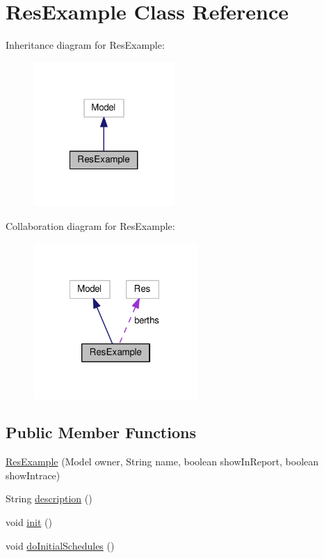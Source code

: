 \hypertarget{class_res_example}{\section{Res\-Example Class Reference}
\label{class_res_example}
}


Inheritance diagram for Res\-Example\-:
\nopagebreak
\begin{figure}[H]
\begin{center}
\leavevmode
\includegraphics[width=152pt]{class_res_example__inherit__graph}
\end{center}
\end{figure}


Collaboration diagram for Res\-Example\-:
\nopagebreak
\begin{figure}[H]
\begin{center}
\leavevmode
\includegraphics[width=177pt]{class_res_example__coll__graph}
\end{center}
\end{figure}
\subsection*{Public Member Functions}
\begin{DoxyCompactItemize}
\item 
\hyperlink{class_res_example_a2dcdaf535117c74d92c6fe97b255ec72}{Res\-Example} (Model owner, String name, boolean show\-In\-Report, boolean show\-Intrace)
\item 
String \hyperlink{class_res_example_a85e7862ebe831403f3da8773ba734b98}{description} ()
\item 
void \hyperlink{class_res_example_a3352131778a1ffb88f5fb1e300a1e0d5}{init} ()
\item 
void \hyperlink{class_res_example_a4855a0db355d1c1d96aa5f96ba303f37}{do\-Initial\-Schedules} ()
\end{DoxyCompactItemize}
